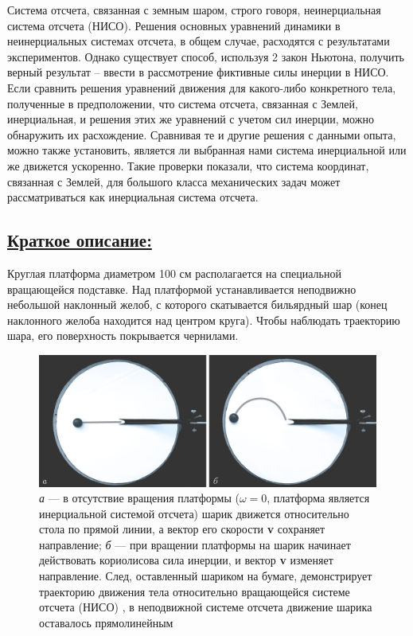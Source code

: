 \documentclass[14pt,a4paper,oneside]{extarticle}	%
\begin{document}
		Система отсчета, связанная с земным шаром, строго говоря, неинерциальная система отсчета (НИСО).
		Решения основных уравнений динамики в неинерциальных системах отсчета, в общем случае, расходятся с результатами экспериментов. Однако существует способ, используя 2 закон Ньютона, получить верный результат -- ввести в рассмотрение фиктивные силы инерции в НИСО. Если сравнить решения уравнений движения для какого-либо конкретного тела, полученные в предположении, что система отсчета, связанная с Землей, инерциальная, и решения этих же уравнений с учетом сил инерции, можно обнаружить их расхождение.
		Сравнивая те и другие решения с данными опыта, можно также установить, является ли выбранная нами система инерциальной или же движется ускоренно.
		Такие проверки показали, что система координат, связанная с Землей, для большого класса механических задач может рассматриваться как инерциальная система отсчета.	
	
	
	\subsection*{\underline{Краткое описание:}}
	
Круглая платформа диаметром 100 см располагается на специальной вращающейся подставке. 
Над платформой устанавливается неподвижно небольшой наклонный желоб, с которого 
скатывается бильярдный шар (конец наклонного желоба находится над центром круга). 
Чтобы наблюдать траекторию шара, его поверхность покрывается чернилами.

\begin{figure}[H] 	
	\centering 	
	\includegraphics[width=0.9\linewidth]{Coriolis-2.png}
	\caption{\textit{а} — в отсутствие вращения платформы ($ \omega=0 $, платформа является инерциальной системой отсчета) шарик движется относительно стола по прямой линии, а вектор его скорости \textbf{v} сохраняет направление; \textit{б} — при вращении платформы на шарик начинает действовать кориолисова сила инерции, и вектор \textbf{v} изменяет направление. След, оставленный шариком на бумаге, демонстрирует траекторию движения тела относительно вращающейся системе отсчета (НИСО) , в неподвижной системе отсчета движение шарика оставалось прямолинейным}
	\label{Coriolis-2}
\end{figure}
\end{document}
